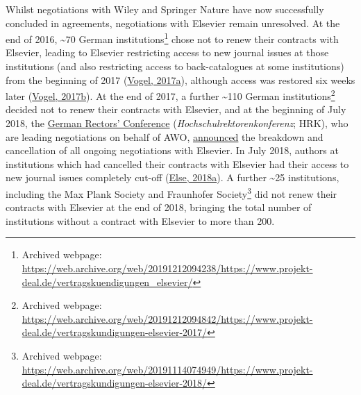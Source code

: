 \documentclass[
]{article}
\begin{document}
Whilst negotiations with Wiley and Springer Nature have now successfully concluded in agreements, negotiations with Elsevier remain unresolved. At the end of 2016, \textasciitilde70 German institutions\footnote{Archived webpage: \url{https://web.archive.org/web/20191212094238/https://www.projekt-deal.de/vertragskuendigungen_elsevier/}} chose not to renew their contracts with Elsevier, leading to Elsevier restricting access to new journal issues at those institutions (and also restricting access to back-catalogues at some institutions) from the beginning of 2017 (\href{https://doi.org/10.1126/science.355.6320.17}{Vogel, 2017a}), although access was restored six weeks later (\href{https://doi.org/10.1126/science.aal0753}{Vogel, 2017b}). At the end of 2017, a further \textasciitilde110 German institutions\footnote{Archived webpage: \url{https://web.archive.org/web/20191212094842/https://www.projekt-deal.de/vertragskundigungen-elsevier-2017/}} decided not to renew their contracts with Elsevier, and at the beginning of July 2018, the \href{https://www.hrk.de/}{German Rectors' Conference} (\emph{Hochschulrektorenkonferenz}; HRK), who are leading negotiations on behalf of AWO, \href{https://www.hrk.de/presse/pressemitteilungen/pressemitteilung/meldung/verhandlungen-von-deal-und-elsevier-elsevier-forderungen-sind-fuer-die-wissenschaft-inakzeptabel-440/}{announced} the breakdown and cancellation of all ongoing negotiations with Elsevier. In July 2018, authors at institutions which had cancelled their contracts with Elsevier had their access to new journal issues completely cut-off (\href{https://doi.org/10.1038/d41586-018-05754-1}{Else, 2018a}). A further \textasciitilde25 institutions, including the Max Plank Society and Fraunhofer Society\footnote{Archived webpage: \url{https://web.archive.org/web/20191114074949/https://www.projekt-deal.de/vertragskundigungen-elsevier-2018/}} did not renew their contracts with Elsevier at the end of 2018, bringing the total number of institutions without a contract with Elsevier to more than 200.
\end{document}
